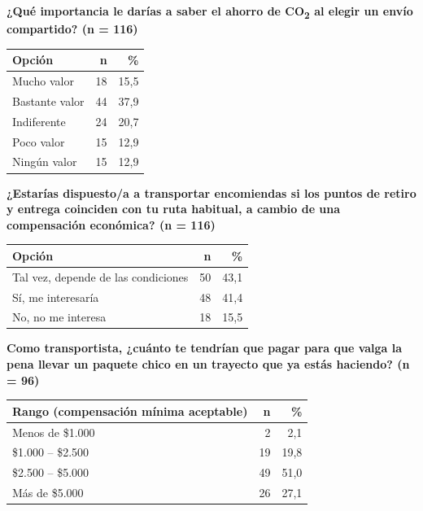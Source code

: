 \bigskip
\noindent\textbf{¿Qué importancia le darías a saber el ahorro de CO\textsubscript{2} al elegir un envío compartido? (n = 116)}

\begin{center}
\begin{tabular}{lrr}
	\toprule
	\textbf{Opción} & \textbf{n} & \textbf{\%} \\
	\midrule
	Mucho valor     & 18 & 15,5 \\
	Bastante valor  & 44 & 37,9 \\
	Indiferente     & 24 & 20,7 \\
	Poco valor      & 15 & 12,9 \\
	Ningún valor    & 15 & 12,9 \\
	\bottomrule
\end{tabular}
\end{center}

\bigskip
\noindent\textbf{¿Estarías dispuesto/a a transportar encomiendas si los puntos de retiro y entrega coinciden con tu ruta habitual, a cambio de una compensación económica? (n = 116)}

\begin{center}
\begin{tabular}{lrr}
	\toprule
	\textbf{Opción} & \textbf{n} & \textbf{\%} \\
	\midrule
	Tal vez, depende de las condiciones  & 50 & 43,1 \\
	Sí, me interesaría                   & 48 & 41,4 \\
	No, no me interesa                   & 18 & 15,5 \\
	\bottomrule
\end{tabular}
\end{center}

\bigskip
\noindent\textbf{Como transportista, ¿cuánto te tendrían que pagar para que valga la pena llevar un paquete chico en un trayecto que ya estás haciendo? (n = 96)}

\begin{center}
\begin{tabular}{lrr}
	\toprule
	\textbf{Rango (compensación mínima aceptable)} & \textbf{n} & \textbf{\%} \\
	\midrule
	Menos de \$1.000      &  2 &  2,1 \\
	\$1.000 -- \$2.500    & 19 & 19,8 \\
	\$2.500 -- \$5.000    & 49 & 51,0 \\
	Más de \$5.000        & 26 & 27,1 \\
	\bottomrule
\end{tabular}
\end{center}

